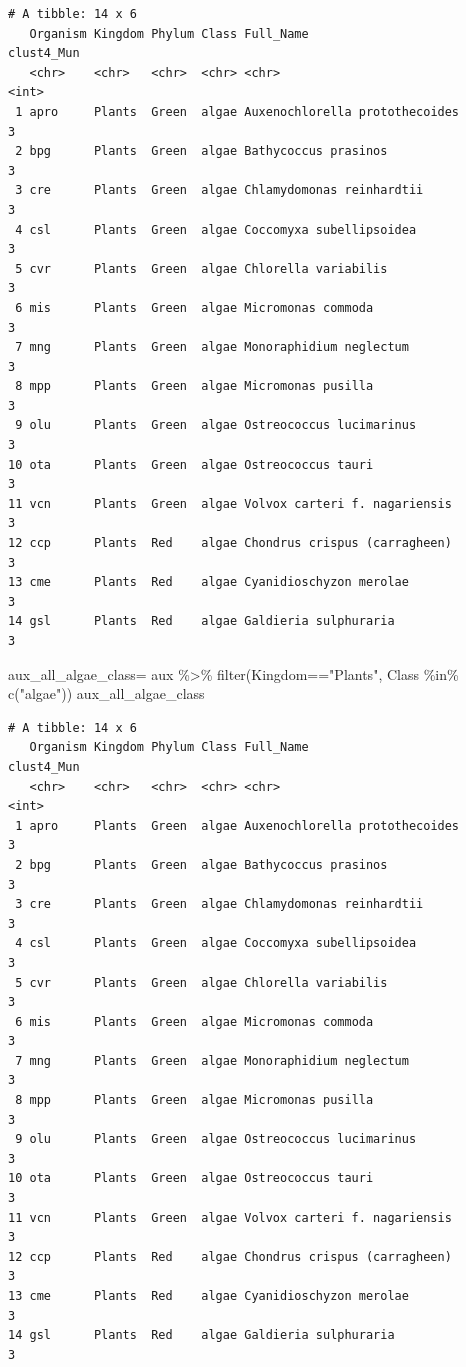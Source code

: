 \documentclass[
  letterpaper,
  DIV=11,
  numbers=noendperiod]{scrreprt}
\newenvironment{Shaded}{}{}
\newcommand{\FunctionTok}[1]{\textcolor[rgb]{0.38,0.69,0.94}{#1}}
\newcommand{\NormalTok}[1]{\textcolor[rgb]{0.67,0.70,0.75}{#1}}
\newcommand{\OtherTok}[1]{\textcolor[rgb]{0.15,0.68,0.38}{#1}}
\newcommand{\SpecialCharTok}[1]{\textcolor[rgb]{0.34,0.71,0.76}{#1}}
\newcommand{\StringTok}[1]{\textcolor[rgb]{0.60,0.76,0.47}{#1}}
\begin{document}
\begin{verbatim}
# A tibble: 14 x 6
   Organism Kingdom Phylum Class Full_Name                      clust4_Mun
   <chr>    <chr>   <chr>  <chr> <chr>                               <int>
 1 apro     Plants  Green  algae Auxenochlorella protothecoides          3
 2 bpg      Plants  Green  algae Bathycoccus prasinos                    3
 3 cre      Plants  Green  algae Chlamydomonas reinhardtii               3
 4 csl      Plants  Green  algae Coccomyxa subellipsoidea                3
 5 cvr      Plants  Green  algae Chlorella variabilis                    3
 6 mis      Plants  Green  algae Micromonas commoda                      3
 7 mng      Plants  Green  algae Monoraphidium neglectum                 3
 8 mpp      Plants  Green  algae Micromonas pusilla                      3
 9 olu      Plants  Green  algae Ostreococcus lucimarinus                3
10 ota      Plants  Green  algae Ostreococcus tauri                      3
11 vcn      Plants  Green  algae Volvox carteri f. nagariensis           3
12 ccp      Plants  Red    algae Chondrus crispus (carragheen)           3
13 cme      Plants  Red    algae Cyanidioschyzon merolae                 3
14 gsl      Plants  Red    algae Galdieria sulphuraria                   3
\end{verbatim}

\begin{Shaded}
\begin{Highlighting}[]
\NormalTok{aux\_all\_algae\_class}\OtherTok{=}\NormalTok{ aux }\SpecialCharTok{\%\textgreater{}\%} 
  \FunctionTok{filter}\NormalTok{(Kingdom}\SpecialCharTok{==}\StringTok{"Plants"}\NormalTok{,}
\NormalTok{         Class }\SpecialCharTok{\%in\%} \FunctionTok{c}\NormalTok{(}\StringTok{"algae"}\NormalTok{))}
\NormalTok{aux\_all\_algae\_class}
\end{Highlighting}
\end{Shaded}

\begin{verbatim}
# A tibble: 14 x 6
   Organism Kingdom Phylum Class Full_Name                      clust4_Mun
   <chr>    <chr>   <chr>  <chr> <chr>                               <int>
 1 apro     Plants  Green  algae Auxenochlorella protothecoides          3
 2 bpg      Plants  Green  algae Bathycoccus prasinos                    3
 3 cre      Plants  Green  algae Chlamydomonas reinhardtii               3
 4 csl      Plants  Green  algae Coccomyxa subellipsoidea                3
 5 cvr      Plants  Green  algae Chlorella variabilis                    3
 6 mis      Plants  Green  algae Micromonas commoda                      3
 7 mng      Plants  Green  algae Monoraphidium neglectum                 3
 8 mpp      Plants  Green  algae Micromonas pusilla                      3
 9 olu      Plants  Green  algae Ostreococcus lucimarinus                3
10 ota      Plants  Green  algae Ostreococcus tauri                      3
11 vcn      Plants  Green  algae Volvox carteri f. nagariensis           3
12 ccp      Plants  Red    algae Chondrus crispus (carragheen)           3
13 cme      Plants  Red    algae Cyanidioschyzon merolae                 3
14 gsl      Plants  Red    algae Galdieria sulphuraria                   3
\end{verbatim}
\end{document}
